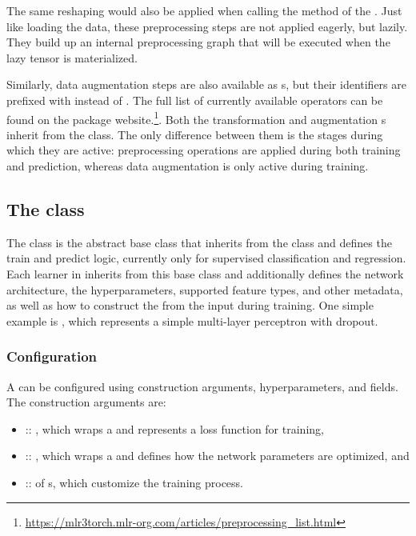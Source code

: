 \documentclass[article]{jss}
\theoremstyle{definition}
\begin{document}
The same reshaping would also be applied when calling the  method of the .
Just like loading the data, these preprocessing steps are not applied eagerly, but lazily.
They build up an internal preprocessing graph that will be executed when the lazy tensor is materialized.

Similarly, data augmentation steps are also available as s, but their identifiers are prefixed with  instead of .
The full list of currently available operators can be found on the package website.\footnote{\url{https://mlr3torch.mlr-org.com/articles/preprocessing_list.html}}.
Both the transformation and augmentation s inherit from the  class.
The only difference between them is the stages during which they are active: preprocessing operations are applied during both training and prediction, whereas data augmentation is only active during training.


\subsection[The LearnerTorch class]{The  class}

The   class is the abstract base class that inherits from the  class and defines the train and predict logic, currently only for supervised classification and regression.
Each learner in  inherits from this base class and additionally defines the network architecture, the hyperparameters, supported feature types, and other metadata, as well as how to construct the  from the input  during training.
One simple example is , which represents a simple multi-layer perceptron with dropout.

\subsubsection{Configuration}

A \torch{}  can be configured using construction arguments, hyperparameters, and fields.
The construction arguments are:

\begin{itemize}
    \item {} :: , which wraps a  and represents a loss function for training,
    \item {} :: , which wraps a  and defines how the network parameters are optimized, and
    \item {} ::  of s, which customize the training process.
\end{itemize}
\end{document}
